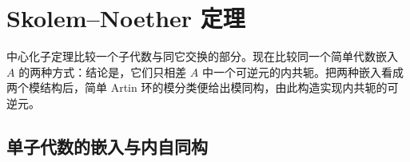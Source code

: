 
\section{Skolem–Noether 定理}
\label{b2:sec:1703}

中心化子定理比较一个子代数与同它交换的部分。现在比较同一个简单代数嵌入 \(A\) 的两种方式：结论是，它们只相差 \(A\) 中一个可逆元的内共轭。把两种嵌入看成两个模结构后，简单 Artin 环的模分类便给出模同构，由此构造实现内共轭的可逆元。

%
%

\subsection{单子代数的嵌入与内自同构}
\label{b2:subsec:1703:01}

